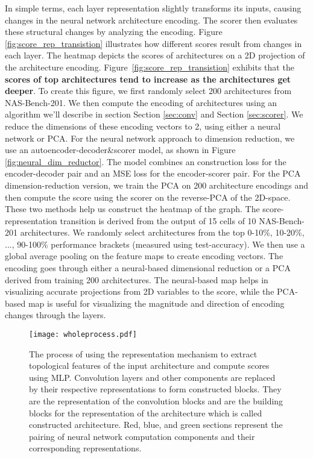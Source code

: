 \documentclass[lettersize,journal]{IEEEtran}
\begin{document}
In simple terms, each layer representation slightly transforms its inputs, causing changes in the neural network architecture encoding. The scorer then evaluates these structural changes by analyzing the encoding. Figure \ref{fig:score_rep_transistion} illustrates how different scores result from changes in each layer. The heatmap depicts the scores of architectures on a 2D projection of the architecture encoding. Figure~\ref{fig:score_rep_transistion} exhibits that the \textbf{scores of top architectures tend to increase as the architectures get deeper}. To create this figure, we first randomly select 200 architectures from NAS-Bench-201. We then compute the encoding of architectures using an algorithm we'll describe in section Section \ref{sec:conv} and Section \ref{sec:scorer}. We reduce the dimensions of these encoding vectors to 2, using either a neural network or PCA. For the neural network approach to dimension reduction, we use an autoencoder-decoder\&scorer model, as shown in Figure \ref{fig:neural_dim_reductor}. The model combines an  construction loss for the encoder-decoder pair and an MSE loss for the encoder-scorer pair. For the PCA dimension-reduction version, we train the PCA on 200 architecture encodings and then compute the score using the scorer on the reverse-PCA of the 2D-space. These two methods help us construct the heatmap of the graph. The score-representation transition is derived from the output of 15 cells of 10 NAS-Bench-201 architectures. We randomly select architectures from the top 0-10\%, 10-20\%, ..., 90-100\% performance brackets (measured using test-accuracy). We then use a global average pooling on the feature maps to create encoding vectors. The encoding goes through either a neural-based dimensional reduction or a PCA derived from training 200 architectures. The neural-based map helps in visualizing accurate projections from 2D variables to the score, while the PCA-based map is useful for visualizing the magnitude and direction of encoding changes through the layers.

    \begin{figure*}
        \centering
        \texttt{[image: wholeprocess.pdf]}
        \caption{The process of using the representation mechanism to extract topological features of the input architecture and compute scores using MLP. Convolution layers and other components are replaced by their respective representations to form constructed blocks. They are the representation of the convolution blocks and are the building blocks for the representation of the architecture which is called constructed architecture. Red, blue, and green sections represent the pairing of neural network computation components and their corresponding representations.}
\label{fig:wholeprocess}
    \end{figure*}
    
\end{document}
